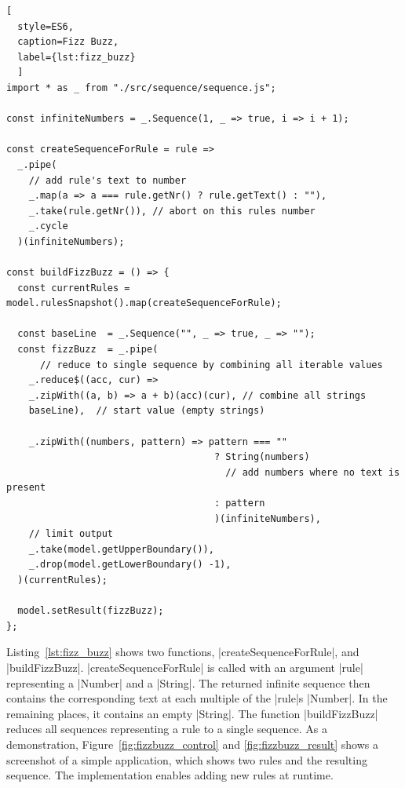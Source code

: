 \begin{lstlisting}[
  style=ES6, 
  caption=Fizz Buzz,
  label={lst:fizz_buzz}
  ]
import * as _ from "./src/sequence/sequence.js";

const infiniteNumbers = _.Sequence(1, _ => true, i => i + 1);

const createSequenceForRule = rule =>
  _.pipe(
    // add rule's text to number
    _.map(a => a === rule.getNr() ? rule.getText() : ""),     
    _.take(rule.getNr()), // abort on this rules number
    _.cycle
  )(infiniteNumbers);

const buildFizzBuzz = () => {
  const currentRules = model.rulesSnapshot().map(createSequenceForRule);

  const baseLine  = _.Sequence("", _ => true, _ => "");
  const fizzBuzz  = _.pipe(
      // reduce to single sequence by combining all iterable values
    _.reduce$((acc, cur) =>       
    _.zipWith((a, b) => a + b)(acc)(cur), // combine all strings
    baseLine),  // start value (empty strings)

    _.zipWith((numbers, pattern) => pattern === "" 
                                     ? String(numbers) 
                                       // add numbers where no text is present
                                     : pattern
                                     )(infiniteNumbers), 
    // limit output
    _.take(model.getUpperBoundary()),
    _.drop(model.getLowerBoundary() -1),
  )(currentRules);

  model.setResult(fizzBuzz);
};
\end{lstlisting}
Listing~\ref{lst:fizz_buzz} shows two functions, |createSequenceForRule|, and
|buildFizzBuzz|. 
|createSequenceForRule| is called with an argument |rule| representing a
|Number| and a |String|. The returned infinite sequence then contains the
corresponding text at each multiple of the |rule|s |Number|. In the remaining places, it
contains an empty |String|. The function |buildFizzBuzz| reduces all sequences
representing a rule to a single sequence. As a demonstration,
Figure~\ref{fig:fizzbuzz_control} and \ref{fig:fizzbuzz_result} shows a
screenshot of a simple application, which shows two rules and the resulting
sequence. The implementation enables adding new rules at runtime. 


